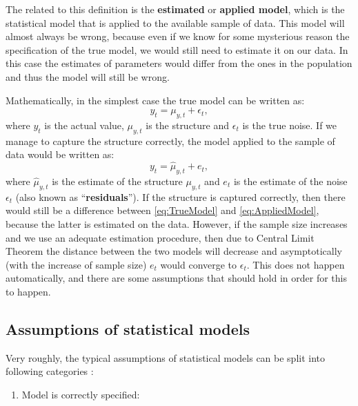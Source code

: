 \documentclass[
]{book}
\providecommand{\tightlist}{%
  \setlength{\itemsep}{0pt}\setlength{\parskip}{0pt}}
\theoremstyle{definition}
\theoremstyle{definition}
\theoremstyle{definition}
\theoremstyle{definition}
\theoremstyle{remark}
\begin{document}
The related to this definition is the \textbf{estimated} or \textbf{applied model}, which is the statistical model that is applied to the available sample of data. This model will almost always be wrong, because even if we know for some mysterious reason the specification of the true model, we would still need to estimate it on our data. In this case the estimates of parameters would differ from the ones in the population and thus the model will still be wrong.

Mathematically, in the simplest case the true model can be written as:
\begin{equation}
    y_t = \mu_{y,t} + \epsilon_t,
    \label{eq:TrueModel}
\end{equation}
where \(y_t\) is the actual value, \(\mu_{y,t}\) is the structure and \(\epsilon_t\) is the true noise. If we manage to capture the structure correctly, the model applied to the sample of data would be written as:
\begin{equation}
    y_t = \hat{\mu}_{y,t} + e_t,
    \label{eq:AppliedModel}
\end{equation}
where \(\hat{\mu}_{y,t}\) is the estimate of the structure \(\mu_{y,t}\) and \(e_t\) is the estimate of the noise \(\epsilon_t\) (also known as ``\textbf{residuals}''). If the structure is captured correctly, then there would still be a difference between \eqref{eq:TrueModel} and \eqref{eq:AppliedModel}, because the latter is estimated on the data. However, if the sample size increases and we use an adequate estimation procedure, then due to Central Limit Theorem \citep[see Chapter 4 of][]{SvetunkovSBA} the distance between the two models will decrease and asymptotically (with the increase of sample size) \(e_t\) would converge to \(\epsilon_t\). This does not happen automatically, and there are some assumptions that should hold in order for this to happen.

\hypertarget{assumptions}{%
\subsection{Assumptions of statistical models}\label{assumptions}}

Very roughly, the typical assumptions of statistical models can be split into following categories \citep{SvetunkovSBA}:

\begin{enumerate}
\def\labelenumi{\arabic{enumi}.}
\tightlist
\item
  Model is correctly specified:
\end{enumerate}
\end{document}
